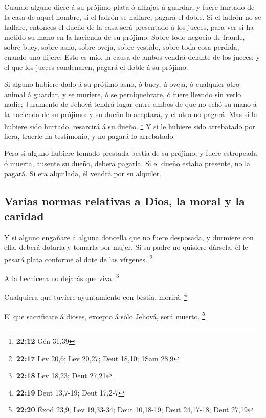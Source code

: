 Cuando alguno diere á su prójimo plata ó alhajas á
guardar, y fuere hurtado de la casa de aquel hombre, si el ladrón se
hallare, pagará el doble.  Si el ladrón no se hallare,
entonces el dueño de la casa será presentado á los jueces, para ver si
ha metido su mano en la hacienda de su prójimo.  Sobre
todo negocio de fraude, sobre buey, sobre asno, sobre oveja, sobre
vestido, sobre toda cosa perdida, cuando uno dijere: Esto es mío, la
causa de ambos vendrá delante de los jueces; y el que los jueces
condenaren, pagará el doble á su prójimo.

 Si alguno hubiere dado á su prójimo asno, ó buey, ú
oveja, ó cualquier otro animal á guardar, y se muriere, ó se
perniquebrare, ó fuere llevado sin verlo nadie; 
Juramento de Jehová tendrá lugar entre ambos de que no echó su mano á la
hacienda de su prójimo: y su dueño lo aceptará, y el otro no pagará.
 Mas si le hubiere sido hurtado, resarcirá á su dueño.
\footnote{\textbf{22:12} Gén 31,39}  Y si le hubiere sido
arrebatado por fiera, traerle ha testimonio, y no pagará lo arrebatado.

 Pero si alguno hubiere tomado prestada bestia de su
prójimo, y fuere estropeada ó muerta, ausente su dueño, deberá pagarla.
 Si el dueño estaba presente, no la pagará. Si era
alquilada, él vendrá por su alquiler.

\hypertarget{varias-normas-relativas-a-dios-la-moral-y-la-caridad}{%
\subsection{Varias normas relativas a Dios, la moral y la
caridad}\label{varias-normas-relativas-a-dios-la-moral-y-la-caridad}}

 Y si alguno engañare á alguna doncella que no fuere
desposada, y durmiere con ella, deberá dotarla y tomarla por mujer.
 Si su padre no quisiere dársela, él le pesará plata
conforme al dote de las vírgenes. \footnote{\textbf{22:17} Lev 20,6; Lev
  20,27; Deut 18,10; 1Sam 28,9}

 A la hechicera no dejarás que viva. \footnote{\textbf{22:18}
  Lev 18,23; Deut 27,21}

 Cualquiera que tuviere ayuntamiento con bestia, morirá.
\footnote{\textbf{22:19} Deut 13,7-19; Deut 17,2-7}

 El que sacrificare á dioses, excepto á sólo Jehová, será
muerto. \footnote{\textbf{22:20} Éxod 23,9; Lev 19,33-34; Deut 10,18-19;
  Deut 24,17-18; Deut 27,19}

